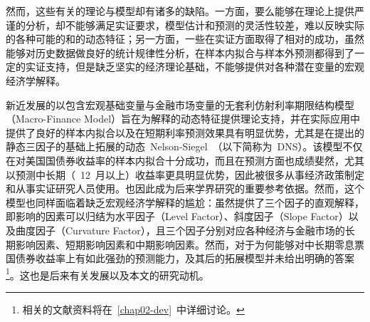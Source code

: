 
然而，这些有关\ts 的理论与模型却有诸多的缺陷。一方面，要么\tsm 能够在理论上提供严谨的分析，却不能够满足实证要求，模型估计和预测的灵活性较差，难以反映实际的各种可能的\yc 和\ts 的动态特征；另一方面，一些\tsm 在实证方面取得了相对的成功，虽然能够对历史数据做良好的\yc 统计规律性分析，在样本内拟合与样本外预测都得到了一定的实证支持，但是缺乏坚实的经济理论基础，不能够提供对各种潜在变量的宏观经济学解释。

新近发展的以包含宏观基础变量与金融市场变量的无套利仿射利率期限结构模型（Macro-Finance Model）旨在为解释\ts 的动态特征提供理论支持，并在实际应用中提供了良好的样本内\yc 拟合以及在短期利率预测效果具有明显优势，尤其是在提出的静态三因子\ts 的基础上拓展的动态~Nelson-Siegel~\tsm（以下简称为~DNS）。该模型不仅在对美国国债券收益率的样本内拟合十分成功，而且在预测方面也成绩斐然，尤其以预测中长期（~12~月以上）收益率更具明显优势，因此被很多从事经济政策制定和从事实证研究人员使用。\dns 也因此成为后来学界研究\tsm 的重要参考依据。然而，这个模型也同样面临着缺乏宏观经济学解释的尴尬：虽然提供了三个因子的直观解释，即影响\ts 的因素可以归结为水平因子（Level Factor）、斜度因子（Slope Factor）以及曲度因子（Curvature Factor），且三个因子分别对应各种经济与金融市场的长期影响因素、短期影响因素和中期影响因素。然而，对于为何\dns 能够对中长期零息票国债券收益率上有如此强劲的预测能力，及其后的拓展模型并未给出明确的答案\footnote{相关的文献资料将在~\ref{chap02-dev}~中详细讨论。}。这也是后来有关\tsm 发展以及本文的研究动机。

